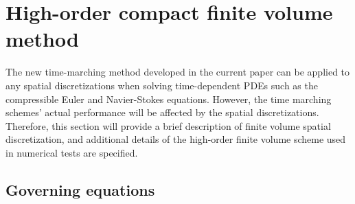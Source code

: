 \section{High-order compact finite volume method}
\label{sec:CFV}

The new time-marching method developed in
the current paper can be applied to
any spatial discretizations when solving
time-dependent PDEs such as the compressible Euler and Navier-Stokes
equations.
However, the time marching schemes' actual performance will be affected by
the spatial discretizations.
Therefore,
this section will provide a brief description of
finite volume spatial  discretization,
and additional details
of the high-order finite volume scheme
used in numerical tests are specified.

\subsection{Governing equations}
\label{ssec:GovEq}

